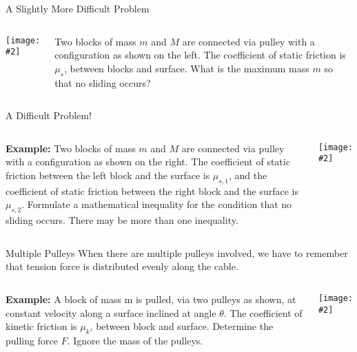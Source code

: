 \documentclass[12pt,compress,aspectratio=169]{beamer}
\newcommand{\pic}[2]{\texttt{[image: \#2]}}
\begin{document}
\begin{frame}{A Slightly More Difficult Problem}
  \begin{columns}
    \pic{1}{graphics/pulley_prob_5.png}
    
    Two blocks of mass $m$ and $M$ are connected via pulley with a
    configuration as shown on the left. The coefficient of static friction is
    $\mu_s$, between blocks and surface. What is the maximum mass $m$ so that
    no sliding occurs?
  \end{columns}
\end{frame}



\begin{frame}{A Difficult Problem!}
  \begin{columns}
    \textbf{Example:} Two blocks of mass $m$ and $M$ are connected via pulley
    with a configuration as shown on the right. The coefficient of static
    friction between the left block and the surface is $\mu_{s,1}$, and the
    coefficient of static friction between the right block and the surface is
    $\mu_{s,2}$. Formulate a mathematical inequality for the condition that no
    sliding occurs. There may be more than one inequality. 
    
    \pic{1}{graphics/pulley_prob_6.png}
  \end{columns}
\end{frame}



\begin{frame}{Multiple Pulleys}
  When there are multiple pulleys involved, we have to remember that tension
  force is distributed evenly along the cable.

  \vspace{.2in}
  \begin{columns}
    \textbf{Example:} A block of mass m is pulled, via two pulleys as shown, at
    constant velocity along a surface inclined at angle $\theta$. The
    coefficient of kinetic friction is $\mu_k$, between block and surface.
    Determine the pulling force $F$. Ignore the mass of the pulleys. 
    
    \pic{1}{graphics/pulley_prob_7.png}
  \end{columns}  
\end{frame}
\end{document}
